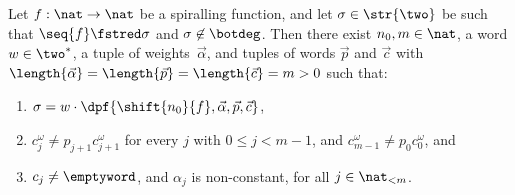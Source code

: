 \begin{lemma}\label{lem:disambiguate}
  Let $f : \nat \to \nat$ be a spiralling function, 
  and let $\sigma \in \str{\two}$ be 
  such that $\seq{f} \fstred \sigma$ and $\sigma \not\in\botdeg$.
  Then there exist $n_0, m \in \nat$, a word $w \in \two^*$,
  a tuple of weights~$\vec{\alpha}$,
  and tuples of words $\vec{p}$ and $\vec{c}$ 
  with $\length{\vec{\alpha}} = \length{\vec{p}} = \length{\vec{c}} = m > 0$
  such that:
\begin{enumerate}
    \item $\sigma = w \cdot \dpf{\shift{n_0}{f},\vec{\alpha},\vec{p},\vec{c}}$,
      \label{item:form}
    \item 
      $c_j^\omega \ne p_{j+1} c_{j+1}^\omega$ for every $j$ with $0 \le j < m-1$, 
      and $c_{m-1}^\omega \ne p_{0} c_{0}^\omega$, and
      \label{item:no:ambiguities}
    \item 
      $c_j \ne \emptyword$,
      and $\alpha_j$ is non-constant, for all $j \in \nat_{<m}$.
      \label{item:no:empty:cycles}
  \end{enumerate}
  
\end{lemma}
